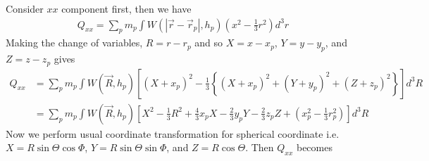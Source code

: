 \documentclass{article}
\begin{document}
Consider $xx$ component first, then we have
\begin{align}
Q_{xx} = \sum_p m_p \int W(|\vec{r} - \vec{r}_p|, h_p) \left(x^2 - \frac{1}{3} r^2 \right) d^3 r 
\end{align}
Making the change of variables, $R = r-r_p$ and so $X=x-x_p$, $Y=y-y_p$, and $Z=z-z_p$ 
gives
\begin{align}
Q_{xx} &= \sum_p m_p \int W(\vec{R},h_p) \left[ (X+x_p)^2 - \frac{1}{3} 
                \left\{ (X+x_p)^2 + (Y+y_p)^2 + (Z+z_p)^2 \right\} \right] d^3 R \nonumber \\
            &= \sum_p m_p \int W(\vec{R},h_p) \left[ X^2 - \frac{1}{3}R^2 + \frac{4}{3} x_p X 
            -\frac{2}{3} y_p Y -\frac{2}{3} z_p Z + \left(x_p^2 - \frac{1}{3} r_p^2\right) \right] d^3 R 
\end{align}
Now we perform usual coordinate transformation for spherical coordinate i.e. $X = R \sin \Theta \cos \Phi$,
$Y = R \sin \Theta \sin \Phi$, and $Z = R \cos \Theta$. Then $Q_{xx}$ becomes
\end{document}
